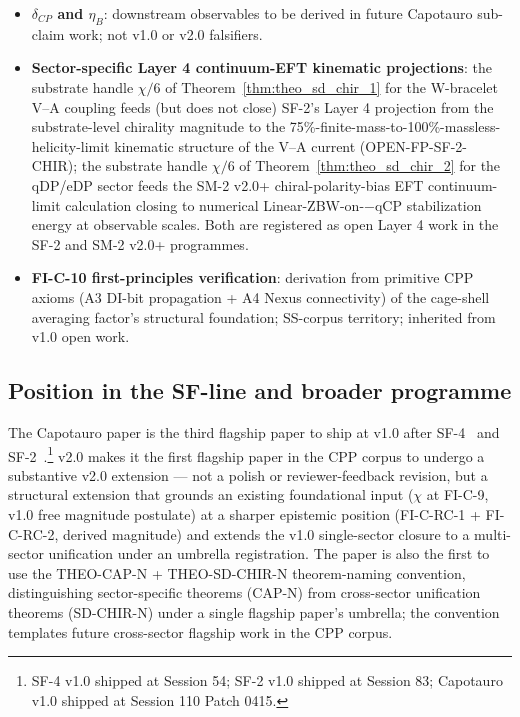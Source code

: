 \documentclass[11pt,letterpaper]{article}
\begin{document}
\begin{itemize}
    \item \textbf{$\delta_{CP}$ and $\eta_B$}: downstream observables to be derived in future Capotauro sub-claim work; not v1.0 or v2.0 falsifiers.
    \item \textbf{Sector-specific Layer 4 continuum-EFT kinematic projections}: the substrate handle $\chi/6$ of Theorem~\ref{thm:theo_sd_chir_1} for the W-bracelet V--A coupling feeds (but does not close) SF-2's Layer 4 projection from the substrate-level chirality magnitude to the 75\%-finite-mass-to-100\%-massless-helicity-limit kinematic structure of the V--A current (OPEN-FP-SF-2-CHIR); the substrate handle $\chi/6$ of Theorem~\ref{thm:theo_sd_chir_2} for the qDP/eDP sector feeds the SM-2 v2.0+ chiral-polarity-bias EFT continuum-limit calculation closing to numerical Linear-ZBW-on-$-$qCP stabilization energy at observable scales. Both are registered as open Layer 4 work in the SF-2 and SM-2 v2.0+ programmes.
    \item \textbf{FI-C-10 first-principles verification}: derivation from primitive CPP axioms (A3 DI-bit propagation + A4 Nexus connectivity) of the cage-shell averaging factor's structural foundation; SS-corpus territory; inherited from v1.0 open work.
\end{itemize}

\subsection{Position in the SF-line and broader programme}\label{sec:position}

The Capotauro paper is the third flagship paper to ship at v1.0 after SF-4~\cite{abshier_sf4} and SF-2~\cite{abshier_sf2}.\footnote{SF-4 v1.0 shipped at Session 54; SF-2 v1.0 shipped at Session 83; Capotauro v1.0 shipped at Session 110 Patch 0415.} v2.0 makes it the first flagship paper in the CPP corpus to undergo a substantive v2.0 extension --- not a polish or reviewer-feedback revision, but a structural extension that grounds an existing foundational input ($\chi$ at FI-C-9, v1.0 free magnitude postulate) at a sharper epistemic position (FI-C-RC-1 + FI-C-RC-2, derived magnitude) and extends the v1.0 single-sector closure to a multi-sector unification under an umbrella registration. The paper is also the first to use the THEO-CAP-N + THEO-SD-CHIR-N theorem-naming convention, distinguishing sector-specific theorems (CAP-N) from cross-sector unification theorems (SD-CHIR-N) under a single flagship paper's umbrella; the convention templates future cross-sector flagship work in the CPP corpus.
\end{document}

